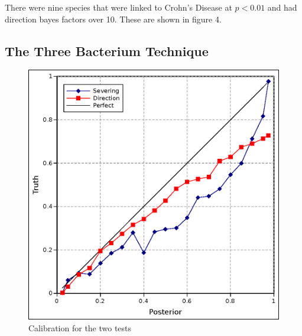 \documentclass[a4paper]{article}
\begin{document}
There were nine species that were linked to Crohn's Disease at $p<0.01$
and had direction bayes factors over 10.  These are shown in figure 4.

\subsection{The Three Bacterium Technique}

\begin{figure}[b!]
  \includegraphics[width=.47\textwidth]{calib}
  \caption{Calibration for the two tests}
\end{figure}
\end{document}
